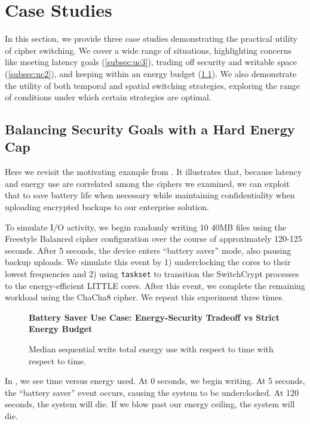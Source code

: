 \section{Case Studies} \label{sec:sc-usecases}

In this section, we provide three case studies demonstrating the practical
utility of cipher switching. We cover a wide range of situations, highlighting
concerns like meeting latency goals (\cref{subsec:uc3}), trading off security
and writable space (\cref{subsec:uc2}), and keeping within an energy budget
(\cref{subsec:uc1}). We also demonstrate the utility of both temporal and
spatial switching strategies, exploring the range of conditions under which
certain strategies are optimal.

\subsection{Balancing Security Goals with a Hard Energy Cap} \label{subsec:uc1}

Here we revisit the motivating example from . It illustrates
that, because latency and energy use are correlated among the ciphers we
examined, we can exploit that to save battery life when necessary while
maintaining confidentiality when uploading encrypted backups to our
enterprise solution.

To simulate I/O activity, we begin randomly writing 10 40MB files using the
Freestyle Balanced cipher configuration over the course of approximately 120-125
seconds. After 5 seconds, the device enters ``battery saver'' mode, also pausing
backup uploads. We simulate this event by 1) underclocking the cores to their
lowest frequencies and 2) using \texttt{taskset} to transition the SwitchCrypt
processes to the energy-efficient LITTLE cores. After this event, we complete
the remaining workload using the ChaCha8 cipher. We repeat this experiment three
times.

\begin{figure}[ht] \textbf{Battery Saver Use Case: Energy-Security Tradeoff vs
   Strict Energy Budget}\par\medskip
   \centering
   {} \caption{Median sequential write total
   energy use with respect to time with respect to time.}
  \label{fig:usecase-battery}
\end{figure}

In , we see time versus energy used. At 0 seconds, we
begin writing. At 5 seconds, the ``battery saver'' event occurs, causing the
system to be underclocked. At 120 seconds, the system will die. If we blow past
our energy ceiling, the system will die.

